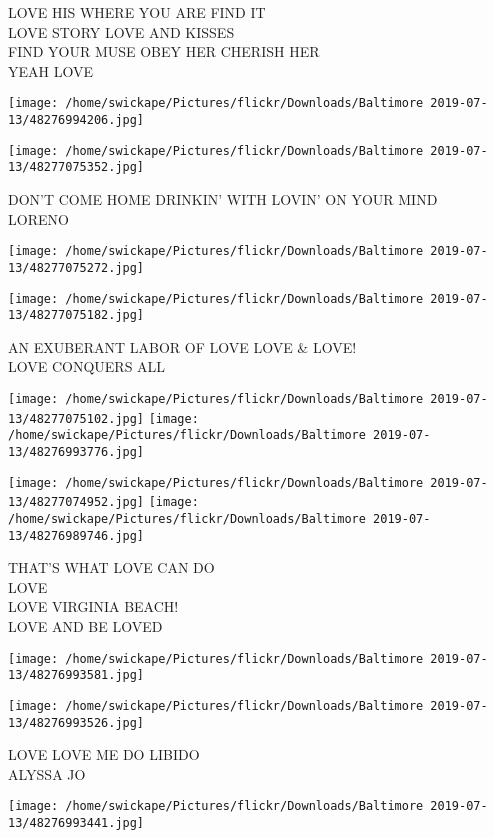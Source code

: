 \documentclass[10pt,letterpaper]{article}
\begin{document}
LOVE HIS WHERE YOU ARE FIND IT\\
LOVE STORY LOVE AND KISSES\\
FIND YOUR MUSE OBEY HER CHERISH HER\\
YEAH LOVE
\pagebreak

\texttt{[image: /home/swickape/Pictures/flickr/Downloads/Baltimore 2019-07-13/48276994206.jpg]}

\vspace{0.25in}
\texttt{[image: /home/swickape/Pictures/flickr/Downloads/Baltimore 2019-07-13/48277075352.jpg]}

DON'T COME HOME DRINKIN' WITH LOVIN' ON YOUR MIND\\
LORENO
\pagebreak

\texttt{[image: /home/swickape/Pictures/flickr/Downloads/Baltimore 2019-07-13/48277075272.jpg]}

\vspace{0.25in}
\texttt{[image: /home/swickape/Pictures/flickr/Downloads/Baltimore 2019-07-13/48277075182.jpg]}

AN EXUBERANT LABOR OF LOVE LOVE \& LOVE!\\
LOVE CONQUERS ALL
\pagebreak

\texttt{[image: /home/swickape/Pictures/flickr/Downloads/Baltimore 2019-07-13/48277075102.jpg]}
\texttt{[image: /home/swickape/Pictures/flickr/Downloads/Baltimore 2019-07-13/48276993776.jpg]}

\texttt{[image: /home/swickape/Pictures/flickr/Downloads/Baltimore 2019-07-13/48277074952.jpg]}
\texttt{[image: /home/swickape/Pictures/flickr/Downloads/Baltimore 2019-07-13/48276989746.jpg]}

THAT'S WHAT LOVE CAN DO\\
LOVE\\
LOVE VIRGINIA BEACH!\\
LOVE AND BE LOVED
\pagebreak

\texttt{[image: /home/swickape/Pictures/flickr/Downloads/Baltimore 2019-07-13/48276993581.jpg]}

\vspace{0.25in}
\texttt{[image: /home/swickape/Pictures/flickr/Downloads/Baltimore 2019-07-13/48276993526.jpg]}

LOVE LOVE ME DO LIBIDO\\
ALYSSA JO
\pagebreak

\texttt{[image: /home/swickape/Pictures/flickr/Downloads/Baltimore 2019-07-13/48276993441.jpg]}
\end{document}
